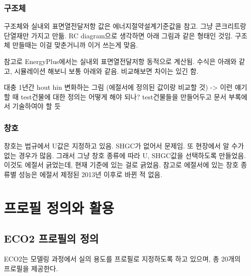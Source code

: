 \subsubsection{구조체}
구조체와 실내외 표면열전달저항 값은 에너지절약설계기준값을 참고. 그냥 콘크리트랑 단열재만 가지고 만듦. RC diagram으로 생각하면 아래 그림과 같은 형태인 것임. 구조체 만들때는 이걸 맞춘거니까 이거 쓰는게 맞음.\par
참고로 EnergyPlus에서는 실내외 표면열전달저항 동적으로 계산됨. 수식은 아래와 같고, 시뮬레이션 해보니 보통 아래와 같음. 비교해보면 차이는 있긴 함.
\begin{tcolorbox}[colback=gray!10, colframe=gray!80, boxrule=0.5pt, left=1em, right=1em]
대충 1년간 hout hin 변화하는 그림 (에절서에 정의된 값이랑 비교할 것) -> 이런 얘기할 때 test건물에 대한 정의는 어떻게 해야 되나? test건물들을 만들어두고 문서 부록에서 기술하여야 할 듯
\end{tcolorbox}

\subsubsection{창호}
창호는 법규에서 U값은 지정하고 있음. SHGC가 없어서 문제임. 또 현장에서 알 수가 없는 경우가 많음. 그래서 그냥 창호 종류에 따라 U, SHGC값을 선택하도록 만들었음.
이것도 에절서 긁었는데, 현재 기준에 있는 걸로 긁었음. 참고로 에절서에 있는 창호 종류별 성능은 에절서 제정된 2013년 이후로 바뀐 적 없음.



\section{프로필 정의와 활용}
\subsection{ECO2 프로필의 정의}
ECO2는 모델링 과정에서 실의 용도를 프로필로 지정하도록 하고 있으며, 총 20개의 프로필을 제공한다.


